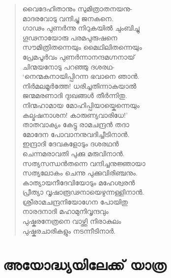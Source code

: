 \begin{verse}
വൈദേഹിതാനും സുമിത്രാതനയനു-\\
മാദരവോടു വന്ദിച്ചു ജനകനെ.\\
ഗാഢം പുണര്‍ന്നു നിറുകയില്‍ ചുംബിച്ചു\\
ഗൂഢനായോരു പരമപുരുഷനെ\\
സൗമിത്രിതന്നെയും മൈഥിലിതന്നെയും\\
പ്രേമപൂര്‍വം പുണര്‍ന്നാനന്ദമഗ്നനായ്\\
ചിന്മയനോടു പറഞ്ഞു ദശരഥ-\\
‘നെന്മകനായിപ്പിറന്ന ഭവാനെ ഞാന്‍.\\
നിര്‍മലമൂര്‍ത്തേ! ധരിച്ചതിന്നാകയാല്‍\\
ജന്മമരണാദി ദുഃഖങ്ങള്‍ തീര്‍ന്നിതു.\\
നിന്മഹാമായ മോഹിപ്പിയായ്കെന്നെയും\\
കല്മഷനാശന! കാരുണ്യവാരിധേ!’\\
താതവാക്യം കേട്ടു രാമചന്ദ്രന്‍ തദാ\\
മോദേന പോവാനനുവദിച്ചീടിനാന്‍.\\
ഇന്ദ്രാദി ദേവകളോടും ദശരഥന്‍\\
ചെന്നമരാവതി പുക്കു മരുവിനാന്‍.\\
സത്യസന്ധന്‍തന്നെ വന്ദിച്ചനുജ്ഞായാ\\
സത്യലോകം ചെന്നു പുക്കുവിരിഞ്ചനും.\\
കാത്യായനീദേവിയോടും മഹേശ്വരന്‍\\
പ്രീത്യാ വൃഷാരൂഢനായെഴുന്നള്ളിനാന്‍.\\
ശ്രീരാമചന്ദ്രനിയോഗേന പോയിതു\\
നാരദനാദി മഹാമുനിവൃന്ദവും\\
പുഷ്കരനേത്രനെ വാഴ്ത്തി നിരാകുലം\\
പുഷ്കരചാരികളും നടന്നീടിനാര്‍.
\end{verse}

\newpage

\section{അയോദ്ധ്യയിലേക്ക് യാത്ര}

